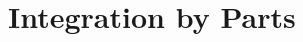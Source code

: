 \section{Integration by Parts} \label{S:5.4.Parts}



\newpage



\newpage



\newpage



\newpage

\clearpage
